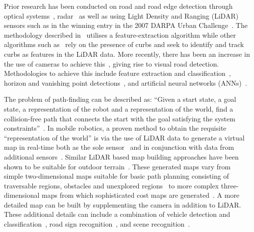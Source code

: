 

Prior research has been conducted on road and road edge detection through optical systems~\cite{p._y._shinzato_road_2014}, radar~\cite{guo_road_2015} as well as using Light Density and Ranging (LiDAR) sensors such as in the winning entry in the 2007 DARPA Urban Challenge~\cite{zhang_lidar-based_2010}. The methodology described in~\cite{nikolova_segmentation_2000} utilises a feature-extraction algorithm while other algorithms such as~\cite{zhao_curb_2012} rely on the presence of curbs and seek to identify and track curbs as features in the LiDAR data. More recently, there has been an increase in the use of cameras to achieve this~\cite{alkhorshid_road_2016}, giving rise to visual road detection. Methodologies to achieve this include feature extraction and classification~\cite{alkhorshid_road_2016}, horizon and vanishing point detections~\cite{p._y._shinzato_fast_2012}, and artificial neural networks (ANNs)~\cite{abbas_novel_2016}.


The problem of path-finding can be described as: ``Given a start state, a goal state, a representation of the robot and a representation of the world, find a collision-free path that connects the start with the goal satisfying the system constraints''~\cite{lavalle_planning_2006}. In mobile robotics, a proven method to obtain the requisite “representation of the world” is via the use of LiDAR data to generate a virtual map in real-time both as the sole sensor~\cite{liu_mobile_2012} and in conjunction with data from additional sensors~\cite{mengyin_multiple_2014}. Similar LiDAR based map building approaches have been shown to be suitable for outdoor terrain~\cite{d._m._cole_using_2006}. These generated maps vary from simple two-dimensional maps suitable for basic path planning consisting of traversable regions, obstacles and unexplored regions~\cite{hao_path_2014} to more complex three-dimensional maps from which sophisticated cost maps are generated~\cite{j._gillula_how_2006}. A more detailed map can be built by supplementing the camera in addition to LiDAR. These additional details can include a combination of vehicle detection and classification~\cite{f._zhang_vehicle_2014}, road sign recognition~\cite{gudigar_review_2016}, and scene recognition~\cite{yang_scene_2015}. 

